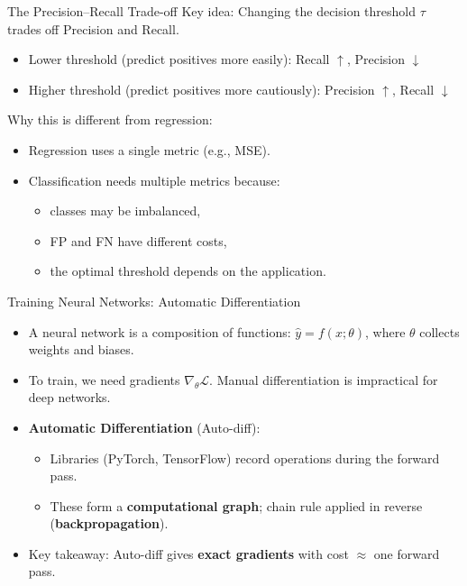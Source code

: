 \documentclass[aspectratio=169]{beamer}
\newcommand{\1}{\mathbf{1}}
\begin{document}
\begin{frame}{The Precision--Recall Trade-off}
    \small
    Key idea:  
    Changing the decision threshold $\tau$ trades off Precision and Recall.
    
    \begin{itemize}
        \setlength\itemsep{0.3em}
        \item Lower threshold (predict positives more easily):
        Recall $\uparrow$, Precision $\downarrow$
    
        \item Higher threshold (predict positives more cautiously):
        Precision $\uparrow$, Recall $\downarrow$
    \end{itemize}
    
    \vspace{0.4em}
    Why this is different from regression:
    \begin{itemize}
        \setlength\itemsep{0.2em}
        \item Regression uses a single metric (e.g., MSE).
        \item Classification needs multiple metrics because:
        \begin{itemize}
            \item classes may be imbalanced,
            \item FP and FN have different costs,
            \item the optimal threshold depends on the application.
        \end{itemize}
    \end{itemize}
\end{frame}


\begin{frame}{Training Neural Networks: Automatic Differentiation}
    \small
    \begin{itemize}
        \setlength\itemsep{0.4em}
        \item A neural network is a composition of functions: $\hat{y} = f(x; \theta)$, where $\theta$ collects weights and biases.
    
        \item To train, we need gradients $\nabla_\theta \mathcal{L}$. Manual differentiation is impractical for deep networks.
    
        \item \textbf{Automatic Differentiation} (Auto-diff):
        \begin{itemize}
            \item Libraries (PyTorch, TensorFlow) record operations during the forward pass.
            \item These form a \textbf{computational graph}; chain rule applied in reverse (\textbf{backpropagation}).
        \end{itemize}
    
        \item Key takeaway: Auto-diff gives \textbf{exact gradients} with cost $\approx$ one forward pass.
    \end{itemize}
\end{frame}
\end{document}
